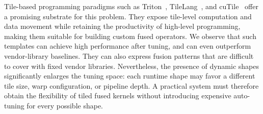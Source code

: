 Tile-based programming paradigms such as Triton~\cite{tillet2019triton}, TileLang~\cite{cheng2025pipethreader}, 
and cuTile~\cite{nvidia25cutile} offer a promising substrate for this problem.
They expose tile-level computation and data movement while retaining
the productivity of high-level programming, making them suitable for building
custom fused operators. We observe that such templates can achieve high
performance after tuning, and can even outperform vendor-library baselines.
They can also express fusion patterns that are
difficult to cover with fixed vendor libraries.
Nevertheless, the presence of dynamic shapes significantly enlarges the tuning space:
each runtime shape may favor a different tile size, warp configuration, or pipeline depth.
A practical system must therefore 
obtain the flexibility of tiled fused kernels without introducing expensive auto-tuning for every possible shape.


